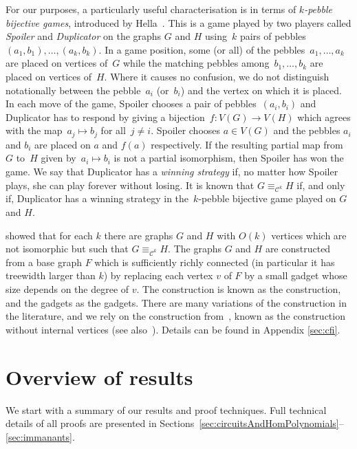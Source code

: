 \documentclass[10pt,a4paper]{article}
\theoremstyle{definition}
\theoremstyle{plain}
\theoremstyle{remark}
\begin{document}
For our purposes, a particularly useful characterisation is in terms
of \emph{$k$-pebble bijective games}, introduced by
Hella~\cite{hella96}.  This is a game played by two players called
\emph{Spoiler} and \emph{Duplicator} on the graphs $G$ and $H$ using~$k$
pairs of pebbles~$(a_1,b_1),\dots,(a_k,b_k)$.  In a game position,
some (or all) of the pebbles~$a_1,\ldots,a_k$ are placed on vertices 
of~$G$ while the matching pebbles among~$b_1,\ldots,b_k$ are
placed on vertices of~$H$.  Where it causes no confusion, we
do not distinguish notationally between the pebble~$a_i$ (or~$b_i$)
and the vertex on which it is placed.  In each move of the game, Spoiler
chooses a pair of pebbles~$(a_i,b_i)$ and Duplicator has to respond by
giving a bijection~$f: V(G) \rightarrow V(H)$ which agrees with
the map~$a_j \mapsto b_j$ for all~$j \neq i$.    Spoiler chooses $a
\in V(G)$ and the pebbles $a_i$ and $b_i$ are placed on $a$ and $f(a)$
respectively.  If the resulting partial map from~$G$ to~$H$ given
by~$a_i \mapsto b_i$ is not a partial isomorphism, then Spoiler has
won the game.   We say that Duplicator has a \emph{winning
	strategy} if, no matter how Spoiler plays, she can play forever
without losing.  It is known that $G  \equiv_{\mathcal{C}^k} H$ if, and only if, Duplicator has a winning
strategy in the~$k$-pebble bijective game played on $G$ and $H$.

\textcite{CFI} showed that for each $k$ there
are graphs $G$ and $H$ with $O(k)$ vertices which are not
isomorphic but such that $G  \equiv_{\mathcal{C}^k} H$.  The graphs
$G$ and $H$ are constructed from a base graph $F$ which is
sufficiently richly connected (in particular it has treewidth larger
than $k$) by replacing each vertex $v$ of $F$ by a small gadget whose
size depends on the degree of $v$.  The construction is known as the
 construction, and the gadgets as the
 gadgets.  There are many variations of the
construction in the literature, and we rely on the construction
from~\cite{roberson_oddomorphisms_2022}, known as the
 construction without internal
vertices (see also~\cite{rossman_csl25}). Details can be found in Appendix \ref{sec:cfi}.


	

	
\section{Overview of results}

We start with a summary of our results and proof techniques. Full technical details of all proofs are presented in Sections~\ref{sec:circuitsAndHomPolynomials}--\ref{sec:immanants}.  
\end{document}
